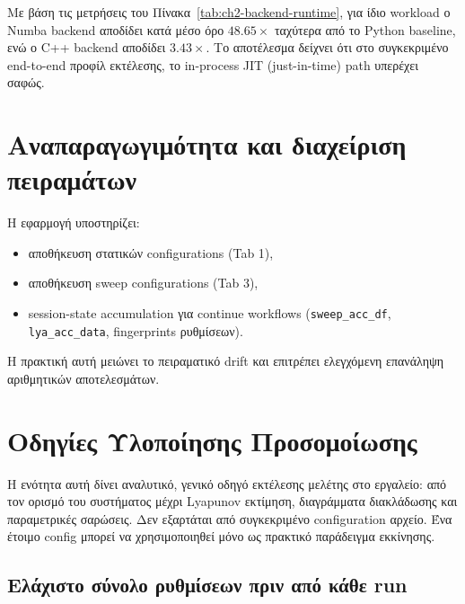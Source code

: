 \documentclass[11pt,a4paper]{report}
\begin{document}
\begin{resultsbox}
Με βάση τις μετρήσεις του Πίνακα~\ref{tab:ch2-backend-runtime}, για ίδιο workload
ο Numba backend αποδίδει κατά μέσο όρο \(48.65\times\) ταχύτερα από το Python baseline,
ενώ ο C++ backend αποδίδει \(3.43\times\). Το αποτέλεσμα δείχνει ότι στο συγκεκριμένο
end-to-end προφίλ εκτέλεσης, το in-process JIT (just-in-time) path υπερέχει σαφώς.
\end{resultsbox}

\section{Αναπαραγωγιμότητα και διαχείριση πειραμάτων}

\begin{guidebox}
Η εφαρμογή υποστηρίζει:
\begin{itemize}
\item αποθήκευση στατικών configurations (Tab 1),
\item αποθήκευση sweep configurations (Tab 3),
\item session-state accumulation για continue workflows
(\texttt{sweep\_acc\_df}, \texttt{lya\_acc\_data}, fingerprints ρυθμίσεων).
\end{itemize}
\end{guidebox}

Η πρακτική αυτή μειώνει το πειραματικό drift και επιτρέπει ελεγχόμενη
επανάληψη αριθμητικών αποτελεσμάτων.


\section{Οδηγίες Υλοποίησης Προσομοίωσης}

Η ενότητα αυτή δίνει αναλυτικό, γενικό οδηγό εκτέλεσης μελέτης στο εργαλείο: από τον ορισμό του συστήματος μέχρι Lyapunov εκτίμηση, διαγράμματα διακλάδωσης και παραμετρικές σαρώσεις. Δεν εξαρτάται από συγκεκριμένο configuration αρχείο. Ένα έτοιμο config μπορεί να χρησιμοποιηθεί μόνο ως πρακτικό παράδειγμα εκκίνησης.

\subsection{Ελάχιστο σύνολο ρυθμίσεων πριν από κάθε run}
\end{document}
